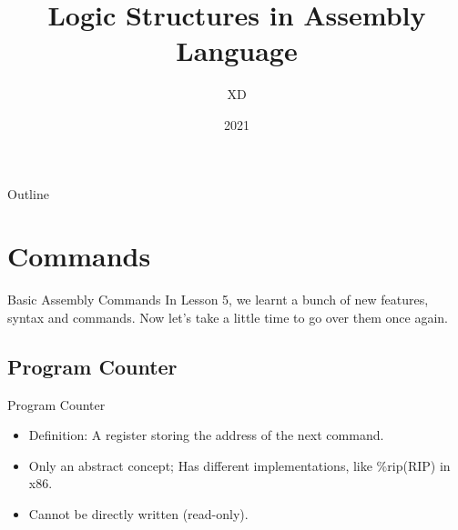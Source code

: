 \documentclass{beamer}
\title{Logic Structures in Assembly Language}
\author{XD}
\institute{Peking University}
\date{2021}
\newtheorem{rmk}{Remark}
\begin{document}
    \frame{\titlepage}
    \begin{frame}{Outline}
        \tableofcontents
    \end{frame}

    \section{Commands}
    \begin{frame}{Basic Assembly Commands}
        In Lesson 5, we learnt a bunch of new features, syntax and commands. Now let's take a little time to go over them once again.
    \end{frame}
        \subsection{Program Counter}
        \begin{frame}{Program Counter}
            \begin{itemize}
                \item Definition: A register storing the address of the next command.
                \item<2-> Only an \alert<2->{abstract concept}; Has different implementations, like \%rip(RIP) in x86.
                \item<3-> Cannot be directly written (read-only).
            \end{itemize}
        \end{frame}
\end{document}
